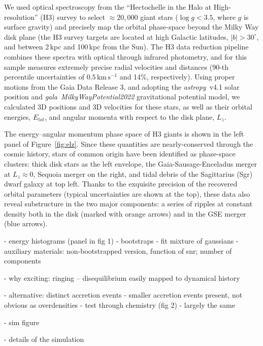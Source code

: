 \documentclass{natureprintstyle}
\newcommand{\kms}{\ensuremath{\textrm{km}\,\textrm{s}^{-1}}}
\newcommand{\package}[1]{\textsl{#1}}
\begin{document}
We used optical spectroscopy from the ``Hectochelle in the Halo at High-resolution'' (H3) survey\cite{conroy:2019} to select $\approx20,000$ giant stars ($\log g<3.5$, where $g$ is surface gravity) and precisely map the orbital phase-space beyond the Milky Way disk plane (the H3 survey targets are located at high Galactic latitudes, $|b|>30^\circ$, and between 2\,kpc and 100\,kpc from the Sun).
The H3 data reduction pipeline\cite{cargile:2020} combines these spectra with optical through infrared photometry, and for this sample measures extremely precise radial velocities and distances (90-th percentile uncertainties of $0.5\,\kms$ and 14\%, respectively).
Using proper motions from the Gaia Data Release 3\cite{gaiaedr3}, and adopting the \package{astropy}~v4.1 solar position\cite{astropy:2022} and \package{gala}~\package{MilkyWayPotential2022} gravitational potential model\cite{gala}, we calculated 3D positions and 3D velocities for these stars, as well as their orbital energies, $E_{tot}$, and angular momenta with respect to the disk plane, $L_z$.


The energy--angular momentum phase space of H3 giants is shown in the left panel of Figure~\ref{fig:elz}.
Since these quantities are nearly-conserved through the cosmic history, stars of common origin have been identified as phase-space clusters: thick disk stars as the left envelope, the Gaia-Sausage-Enceladus merger\cite{belokurov:2018,helmi:2018} at $L_z\approx0$, Sequoia merger\cite{myeong:2019,naidu:2020} on the right, and tidal debris of the Sagittarius (Sgr) dwarf galaxy\cite{ibata:2001,johnson:2020} at top left.
Thanks to the exquisite precision of the recovered orbital parameters (typical uncertainties are shown at the top), these data also reveal substructure in the two major components: a series of ripples at constant density both in the disk (marked with orange arrows) and in the GSE merger (blue arrows).

- energy histograms (panel in fig 1)
- bootstraps
- fit mixture of gaussians
- auxiliary materials: non-bootstrapped version, function of snr; number of components

- why exciting: ringing -- disequilibrium easily mapped to dynamical history

- alternative: distinct accretion events
- smaller accretion events present, not obvious as overdensities\cite{naidu:2020}
- test through chemistry (fig 2)
- largely the same

- sim figure

- details of the simulation
\end{document}
